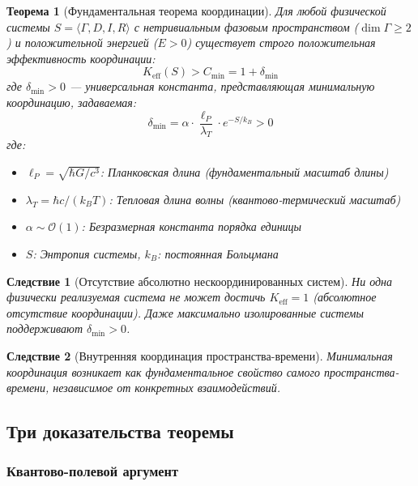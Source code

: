 \documentclass[11pt,a4paper]{article}
\newtheorem{theorem}{Теорема}
\newtheorem{corollary}{Следствие}
\begin{document}
	\begin{theorem}[Фундаментальная теорема координации]
		Для любой физической системы $S = \langle \Gamma, D, I, R \rangle$ с нетривиальным фазовым пространством ($\dim\Gamma \geq 2$) и положительной энергией ($E > 0$) существует строго положительная эффективность координации:
		\begin{equation}
			\boxed{K_{\mathrm{eff}}(S) > C_{\min} = 1 + \delta_{\min}}
		\end{equation}
		где $\delta_{\min} > 0$ — универсальная константа, представляющая минимальную координацию, задаваемая:
		\begin{equation}
			\delta_{\min} = \alpha \cdot \frac{\ell_P}{\lambda_T} \cdot e^{-S/k_B} > 0
		\end{equation}
		где:
		\begin{itemize}
			\item $\ell_P = \sqrt{\hbar G/c^3}$: Планковская длина (фундаментальный масштаб длины)
			\item $\lambda_T = \hbar c/(k_B T)$: Тепловая длина волны (квантово-термический масштаб)
			\item $\alpha \sim \mathcal{O}(1)$: Безразмерная константа порядка единицы
			\item $S$: Энтропия системы, $k_B$: постоянная Больцмана
		\end{itemize}
	\end{theorem}
	
	\begin{corollary}[Отсутствие абсолютно нескоординированных систем]
		Ни одна физически реализуемая система не может достичь $K_{\mathrm{eff}} = 1$ (абсолютное отсутствие координации). Даже максимально изолированные системы поддерживают $\delta_{\min} > 0$.
	\end{corollary}
	
	\begin{corollary}[Внутренняя координация пространства-времени]
		Минимальная координация возникает как фундаментальное свойство самого пространства-времени, независимое от конкретных взаимодействий.
	\end{corollary}
	
	\subsection{Три доказательства теоремы}
	
	\subsubsection{Квантово-полевой аргумент}
	
\end{document}
